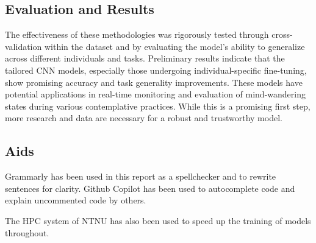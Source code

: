 \subsection{Evaluation and Results}
The effectiveness of these methodologies was rigorously tested through cross-validation within the dataset and by evaluating the model's ability to generalize across different individuals and tasks. Preliminary results indicate that the tailored CNN models, especially those undergoing individual-specific fine-tuning, show promising accuracy and task generality improvements. These models have potential applications in real-time monitoring and evaluation of mind-wandering states during various contemplative practices. While this is a promising first step, more research and data are necessary for a robust and trustworthy model.

\subsection{Aids}
Grammarly has been used in this report as a spellchecker and to rewrite sentences for clarity. Github Copilot has been used to autocomplete code and explain uncommented code by others.

The HPC system of NTNU has also been used to speed up the training of models throughout.

